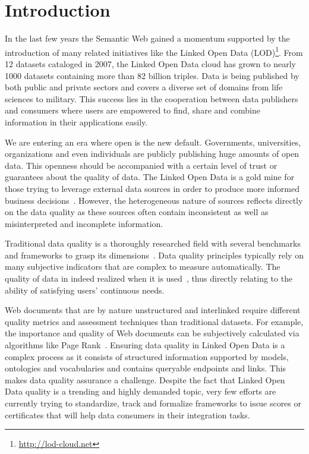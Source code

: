 \documentclass[onecolumn, crcready]{../../Util/LaTEX/iosart2c}
\begin{document}

\section{Introduction}
\label{sec:introduction}
In the last few years the Semantic Web gained a momentum supported by the introduction of many related initiatives like the Linked Open Data (LOD)\footnote{\url{http://lod-cloud.net}}. From 12 datasets cataloged in 2007, the Linked Open Data cloud has grown to nearly 1000 datasets containing more than 82 billion triples. Data is being published by both public and private sectors and covers a diverse set of domains from life sciences to military. This success lies in the cooperation between data publishers and consumers where users are empowered to find, share and combine information in their applications easily.

We are entering an era where open is the new default. Governments, universities, organizations and even individuals are publicly publishing huge amounts of open data. This openness should be accompanied with a certain level of trust or guarantees about the quality of data. The Linked Open Data is a gold mine for those trying to leverage external data sources in order to produce more informed business decisions~\cite{Boyd:Article:11}. However, the heterogeneous nature of sources reflects directly on the data quality as these sources often contain inconsistent as well as misinterpreted and incomplete information.

Traditional data quality is a thoroughly researched field with several benchmarks and frameworks to grasp its dimensions~\cite{Kahn:ACM:02,Stvilia:ASIST:07,Wang:MIS:96}. Data quality principles typically rely on many subjective indicators that are complex to measure automatically. The quality of data in indeed realized when it is used~\cite{Juran:McGraw:99}, thus directly relating to the ability of satisfying users' continuous needs.

Web documents that are by nature unstructured and interlinked require different quality metrics and assessment techniques than traditional datasets. For example, the importance and quality of Web documents can be subjectively calculated via algorithms like Page Rank~\cite{ Page:TechReport:98}. Ensuring data quality in Linked Open Data is a complex process as it consists of structured information supported by models, ontologies and vocabularies and contains queryable endpoints and links. This makes data quality assurance a challenge. Despite the fact that Linked Open Data quality is a trending and highly demanded topic, very few efforts are currently trying to standardize, track and formalize frameworks to issue scores or certificates that will help data consumers in their integration tasks.
\end{document}

